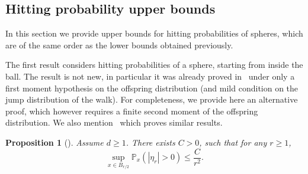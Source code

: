 \documentclass[JEP,XML,SOM,Unicode,NoFloatCountersInSection,published]{cedram}
\theoremstyle{plain}
\newtheorem{proposition}[theorem]{Proposition}
\theoremstyle{definition}
\newcommand{\1}{{\text{\Large $\mathfrak 1$}}}
\begin{document}
\subsection{Hitting probability upper bounds}
In this section we provide upper bounds for hitting probabilities of spheres, which are of the same order as the lower bounds obtained previously.

The first result considers hitting probabilities of a sphere, starting from inside the ball.
The result is not new, in particular it was already proved in~\cite[Prop.\,10.3]{Zhu1} under only a first moment hypothesis on the offspring distribution (and mild condition on the jump distribution of the walk). For completeness, we provide here an alternative proof, which however requires a finite second moment of the offspring distribution. We also mention~\cite{Kes} which proves similar results.
\begin{proposition}[\cite{Zhu1}]\label{prop.hit.inside}
Assume $d\ge 1$. There exists $C>0$, such that for any $r\ge 1$,
\begin{equation*}
\sup_{x\in B_{r/2}} \mathbb P_x(|\eta_r|>0) \le \frac{C}{r^2}.
\end{equation*}
\end{proposition}
\end{document}
